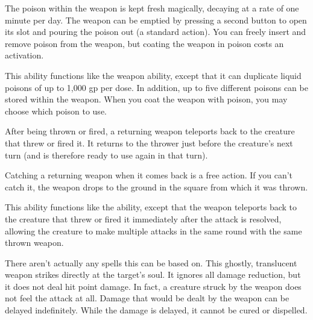 The poison within the weapon is kept fresh magically, decaying at a rate of one minute per day.
The weapon can be emptied by pressing a second button to open its slot and pouring the poison out (a standard action).
You can freely insert and remove poison from the weapon, but coating the weapon in poison costs an activation.


 This ability functions like the  weapon ability, except that it can duplicate liquid poisons of up to 1,000 gp per dose.
In addition, up to five different poisons can be stored within the weapon.
When you coat the weapon with poison, you may choose which poison to use.


 After being thrown or fired, a returning weapon teleports back to the creature that threw or fired it.
It returns to the thrower just before the creature's next turn (and is therefore ready to use again in that turn).

Catching a returning weapon when it comes back is a free action.
If you can't catch it, the weapon drops to the ground in the square from which it was thrown.


 This ability functions like the  ability, except that the weapon teleports back to the creature that threw or fired it immediately after the attack is resolved, allowing the creature to make multiple attacks in the same round with the same thrown weapon.


There aren't actually any spells this can be based on.
 This ghostly, translucent weapon strikes directly at the target's soul.
It ignores all damage reduction, but it does not deal hit point damage.
In fact, a creature struck by the weapon does not feel the attack at all.
Damage that would be dealt by the weapon can be delayed indefinitely.
While the damage is delayed, it cannot be cured or dispelled.

